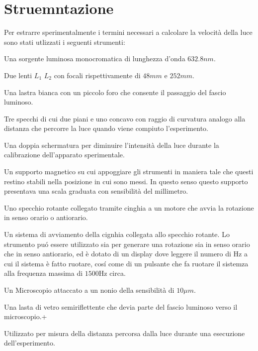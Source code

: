 \documentclass[a4paper,11pt]{article}
\begin{document}
\section{Struemntazione}

Per estrarre sperimentalmente i termini necessari a calcolare la velocità della luce sono stati utlizzati i seguenti strumenti:

\begin{description}[align=left]
	
	\item[Laser] Una sorgente luminosa monocromatica di lunghezza d'onda $632.8 nm$.
	\item[Lenti] Due lenti $L_1$ $L_2$ con focali rispettivamente di $48mm$ e $252mm$.
	\item[Squadra Forata] Una lastra bianca con un piccolo foro che consente il passaggio del fascio luminoso.
	\item[Specchi] Tre specchi di cui due piani e uno concavo con raggio di curvatura analogo alla distanza che percorre la luce quando viene compiuto l'esperimento.
	\item[Doppia Lamina Polaroid] Una doppia schermatura per diminuire l'intensità della luce durante la calibrazione dell'apparato sperimentale.
	\item[Supporto] Un supporto magnetico su cui appoggiare gli strumenti in maniera tale che questi restino stabili nella posizione in cui sono messi. In questo senso questo supporto presentava una scala graduata con sensibilità del millimetro.
	\item[Specchio Rotante] Uno specchio rotante collegato tramite cinghia a un motore che avvia la rotazione in senso orario o antiorario.
	\item[Motore] Un sistema di avviamento della cignhia collegata allo specchio rotante. Lo strumento pu\'o essere utilizzato sia per generare una rotazione sia in senso orario che in senso antiorario, ed è dotato di un display dove leggere il numero di Hz a cui il sistema è fatto ruotare, cos\'i come di un pulsante che fa ruotare il sistemza alla frequenza massima di $1500$Hz circa.
	\item[Microscopio] Un Microscopio attaccato a un nonio della sensibilità di $10 \mu m$.
	\item[Splitter] Una lasta di vetro semiriflettente che devia parte del fascio luminoso verso il microscopio.+
	\item[Metro] Utilizzato per misura della distanza percorsa dalla luce durante una esecuzione dell'esperimento.
\end{description}
	
\end{document}
